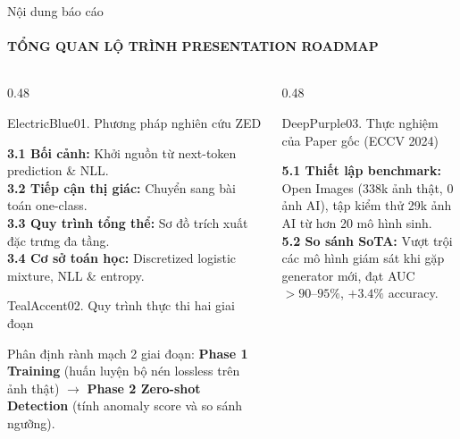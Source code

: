 \documentclass[aspectratio=169, 10pt, t]{beamer}
\begin{document}
\begin{frame}{Nội dung báo cáo}
  \framesubtitle{TỔNG QUAN LỘ TRÌNH \;\textbar\; PRESENTATION ROADMAP}
  \begin{columns}[t]
    \begin{column}{0.48\textwidth}
      \begin{accentbox}[equal height group=toc1, top=0.7mm, bottom=0.7mm]{ElectricBlue}{01. Phương pháp nghiên cứu ZED}
        \raggedright\scriptsize
        \textbf{3.1 Bối cảnh:} Khởi nguồn từ next-token prediction \& NLL.\\
        \vspace{0.04em}
        \textbf{3.2 Tiếp cận thị giác:} Chuyển sang bài toán one-class.\\
        \vspace{0.04em}
        \textbf{3.3 Quy trình tổng thể:} Sơ đồ trích xuất đặc trưng đa tầng.\\
        \vspace{0.04em}
        \textbf{3.4 Cơ sở toán học:} Discretized logistic mixture, NLL \& entropy.
      \end{accentbox}
      \vspace{0.05em}
      \begin{accentbox}[equal height group=toc2, top=0.7mm, bottom=0.7mm]{TealAccent}{02. Quy trình thực thi hai giai đoạn}
        \raggedright\scriptsize
        Phân định rành mạch 2 giai đoạn: \textbf{Phase 1 Training} (huấn luyện bộ nén lossless trên ảnh thật) $\longrightarrow$ \textbf{Phase 2 Zero-shot Detection} (tính anomaly score và so sánh ngưỡng).
      \end{accentbox}
    \end{column}
    \begin{column}{0.48\textwidth}
      \begin{accentbox}[equal height group=toc1, top=0.7mm, bottom=0.7mm]{DeepPurple}{03. Thực nghiệm của Paper gốc (ECCV 2024)}
        \raggedright\scriptsize
        \textbf{5.1 Thiết lập benchmark:} Open Images (338k ảnh thật, 0 ảnh AI), tập kiểm thử 29k ảnh AI từ hơn 20 mô hình sinh.\\
        \vspace{0.04em}
        \textbf{5.2 So sánh SoTA:} Vượt trội các mô hình giám sát khi gặp generator mới, đạt AUC $>90\text{--}95\%$, $+3.4\%$ accuracy.
      \end{accentbox}
      \vspace{0.05em}

\end{column}
\end{columns}
\end{frame}
\end{document}
